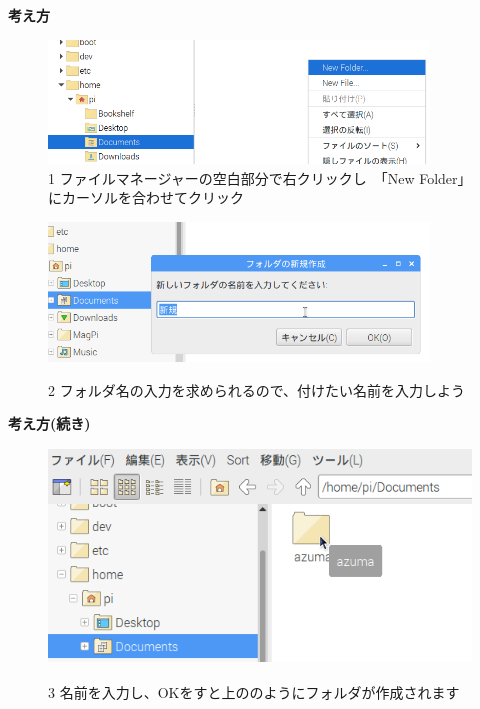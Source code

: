 \documentclass[a4paper,12pt]{jarticle}
\begin{document}
{\bf \large 考え方}
\begin{figure}[ht]
  \includegraphics[width=0.9\textwidth]{textbook-img034.png}
    \centering
    \\1
    ファイルマネージャーの空白部分で右クリックし　「New Folder」にカーソルを合わせてクリック
    \vspace{60pt}
  \begin{minipage}{\textwidth}
    \includegraphics[width=0.9\textwidth]{textbook-img036.png}
  \end{minipage}
    2
    フォルダ名の入力を求められるので、付けたい名前を入力しよう
\end{figure}
\clearpage
{\bf\large 考え方(続き)}
\begin{figure}[hb]
  \centering
  \includegraphics[width=11.398cm,height=5.72cm]{textbook-img038.png}
  \centering
  \begin{minipage}{13.001cm}
    3
    名前を入力し、OKをすと上ののようにフォルダが作成されます
  \end{minipage}

\end{figure}
\end{document}
